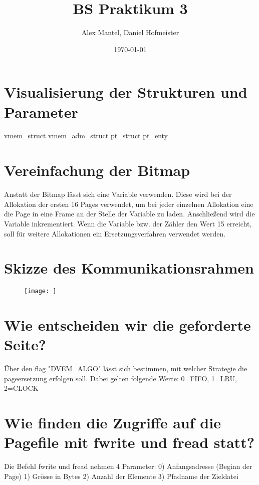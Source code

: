 \documentclass[pdftex,10pt,a4paper]{article}
\begin{document}
\title{BS Praktikum 3}
\author{Alex Mantel, Daniel Hofmeister}
\date{\today}
\maketitle
\newpage

\tableofcontents
\newpage

\section{Visualisierung der Strukturen und Parameter}
        
vmem\_struct
  vmem\_adm\_struct
  pt\_struct
    pt\_enty

\section{Vereinfachung der Bitmap}
Anstatt der Bitmap l\"asst sich eine Variable verwenden. Diese wird bei der Allokation der ersten 16 Pages verwendet, um bei jeder einzelnen Allokation eine die Page in eine Frame an der Stelle der Variable zu laden. Anschlie{\ss}end wird die Variable inkrementiert. Wenn die Variable bzw. der Z\"ahler den Wert 15 erreicht, soll f\"ur weitere Allokationen ein Ersetzungsverfahren verwendet werden.

\section{Skizze des Kommunikationsrahmen}
\begin{figure}[h]
  \label{fig:Kommunikation}
  \texttt{[image: ]}
\end{figure}

\section{Wie entscheiden wir die geforderte Seite?}
\"Uber den flag "DVEM_ALGO" l\"asst sich bestimmen, mit welcher Strategie die pageersetzung erfolgen soll. Dabei gelten folgende Werte: 0=FIFO, 1=LRU, 2=CLOCK

\section{Wie finden die Zugriffe auf die Pagefile mit fwrite und fread statt?}
Die Befehl fwrite und fread nehmen 4 Parameter:
0) Anfangsadresse (Beginn der Page)
1) Gr\"osse in Bytes
2) Anzahl der Elemente 
3) Pfadname der Zieldatei
\end{document}
